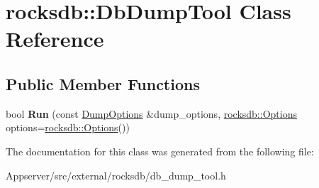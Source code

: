 \hypertarget{classrocksdb_1_1DbDumpTool}{}\section{rocksdb\+:\+:Db\+Dump\+Tool Class Reference}
\label{classrocksdb_1_1DbDumpTool}
\subsection*{Public Member Functions}
\begin{DoxyCompactItemize}
\item 
bool {\bfseries Run} (const \hyperlink{structrocksdb_1_1DumpOptions}{Dump\+Options} \&dump\+\_\+options, \hyperlink{structrocksdb_1_1Options}{rocksdb\+::\+Options} options=\hyperlink{structrocksdb_1_1Options}{rocksdb\+::\+Options}())\hypertarget{classrocksdb_1_1DbDumpTool_a0a6a5d51a134750a159fab137f6bc452}{}\label{classrocksdb_1_1DbDumpTool_a0a6a5d51a134750a159fab137f6bc452}

\end{DoxyCompactItemize}


The documentation for this class was generated from the following file\+:\begin{DoxyCompactItemize}
\item 
Appserver/src/external/rocksdb/db\+\_\+dump\+\_\+tool.\+h\end{DoxyCompactItemize}
